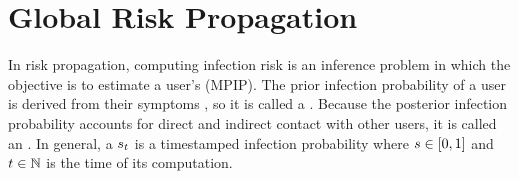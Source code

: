 \section{Global Risk Propagation}

\newcommand{\eventspace}{\Omega}
\newcommand{\event}{\omega}
\newcommand{\topk}[1]{\text{top } K \text{ of } #1}
\newcommand{\scores}[2]{R_{#1}^{(#2)}}
\newcommand{\diff}[1]{\delta_{#1}}

In risk propagation, computing infection risk is an inference problem in which the objective is to estimate a user's  (MPIP). The prior infection probability of a user is derived from their symptoms \cite{Menni2020}, so it is called a . Because the posterior infection probability accounts for direct and indirect contact with other users\footnotemark{}, it is called an . In general, a  $s_t$ is a timestamped infection probability where $s \in [0, 1]$ and $t \in \mathbb{N}$ is the time of its computation.



